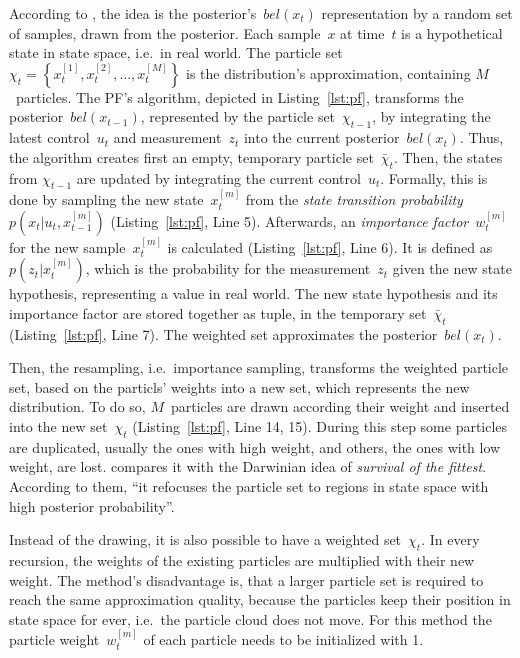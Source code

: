 According to \citet{thrun:prob_robo}, the idea is the posterior's~$bel(x_t)$ representation by a random set of samples, drawn from the posterior. Each sample~$x$ at time~$t$ is a hypothetical state in state space, i.e.\ in real world. The particle set $\chi_t = \left\{ x^{[1]}_t, x^{[2]}_t, \ldots, x^{[M]}_t \right\}$ is the distribution's approximation, containing $M$~particles. The \ac{PF}'s algorithm, depicted in Listing~\ref{lst:pf}, transforms the posterior~$bel(x_{t-1})$, represented by the particle set~$\chi_{t-1}$, by integrating the latest control~$u_t$ and measurement~$z_t$ into the current posterior~$bel(x_t)$. Thus, the algorithm creates first an empty, temporary particle set~$\bar{\chi}_t$. Then, the states from $\chi_{t-1}$ are updated by integrating the current control~$u_t$. Formally, this is done by sampling the new state~$x^{[m]}_t$ from the \emph{state transition probability}~$p(x_t|u_t, x^{[m]}_{t-1})$ (Listing~\ref{lst:pf}, Line 5). Afterwards, an \emph{importance factor}~$w^{[m]}_t$ for the new sample~$x^{[m]}_t$ is calculated (Listing~\ref{lst:pf}, Line 6). It is defined as $p(z_t|x^{[m]}_t)$, which is the probability for the measurement~$z_t$ given the new state hypothesis, representing a value in real world. The new state hypothesis and its importance factor are stored together as tuple, in the temporary set~$\bar{\chi}_t$ (Listing~\ref{lst:pf}, Line 7). The weighted set approximates the posterior~$bel(x_t)$.

Then, the resampling, i.e.\ importance sampling, transforms the weighted particle set, based on the particls' weights into a new set, which represents the new distribution. To do so, $M$~particles are drawn according their weight and inserted into the new set~$\chi_t$ (Listing~\ref{lst:pf}, Line 14, 15). During this step some particles are duplicated, usually the ones with high weight, and others, the ones with low weight, are lost. \citet{thrun:prob_robo} compares it with the Darwinian idea of \emph{survival of the fittest}. According to them, ``it refocuses the particle set to regions in state space with high posterior probability''.
 
Instead of the drawing, it is also possible to have a weighted set~$\chi_t$. In every recursion, the weights of the existing particles are multiplied with their new weight. The method's disadvantage is, that a larger particle set is required to reach the same approximation quality, because the particles keep their position in state space for ever, i.e.\ the particle cloud does not move. For this method the particle weight~$w^{[m]}_t$ of each particle needs to be initialized with 1.
 
